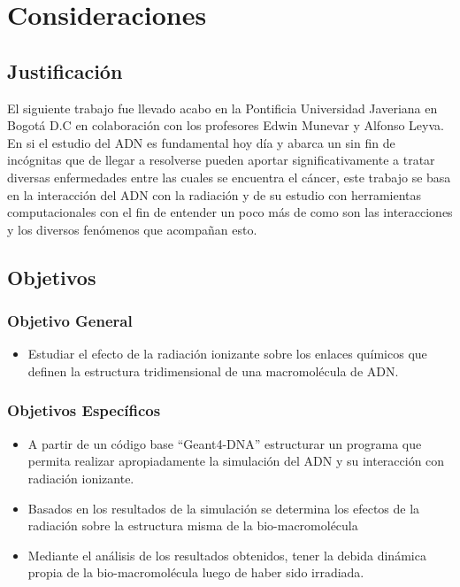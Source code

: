 \clearpage
\section{Consideraciones}

\subsection{Justificación}
\label{sec:Intro}
El siguiente trabajo fue llevado acabo en la Pontificia Universidad Javeriana en Bogotá D.C en colaboración con los profesores Edwin Munevar y Alfonso Leyva. En si el estudio del ADN es fundamental hoy día y abarca un sin fin de incógnitas que de llegar a resolverse pueden aportar significativamente a tratar diversas enfermedades entre las cuales se encuentra el cáncer, este trabajo se basa en la interacción del ADN con la radiación y de su estudio con herramientas computacionales con el fin de entender un poco más de como son las interacciones y los diversos fenómenos que acompañan esto.
\subsection{Objetivos}
\subsubsection{Objetivo General}
\begin{itemize}
  \item Estudiar el efecto de la radiación ionizante sobre los enlaces químicos que definen la estructura tridimensional de una macromolécula de ADN.
\end{itemize}
\subsubsection{Objetivos Específicos}
\begin{itemize}
  \item A partir de un código base “Geant4-DNA” estructurar un programa que permita realizar apropiadamente la simulación del ADN y su interacción con radiación ionizante.
  \item Basados en los resultados de la simulación se determina los efectos de la radiación sobre la estructura misma de la bio-macromolécula
  \item Mediante el análisis de los resultados obtenidos, tener la debida dinámica propia de la bio-macromolécula luego de haber sido irradiada.
\end{itemize}
